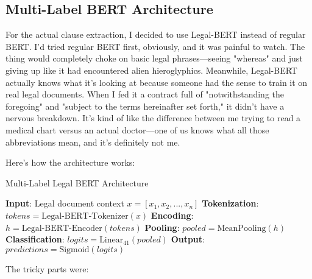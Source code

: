 \subsection{Multi-Label BERT Architecture}

For the actual clause extraction, I decided to use Legal-BERT \cite{chalkidis2020legal} instead of regular BERT. I'd tried regular BERT first, obviously, and it was painful to watch. The thing would completely choke on basic legal phrases—seeing "whereas" and just giving up like it had encountered alien hieroglyphics. Meanwhile, Legal-BERT actually knows what it's looking at because someone had the sense to train it on real legal documents. When I fed it a contract full of "notwithstanding the foregoing" and "subject to the terms hereinafter set forth," it didn't have a nervous breakdown. It's kind of like the difference between me trying to read a medical chart versus an actual doctor—one of us knows what all those abbreviations mean, and it's definitely not me.

Here's how the architecture works:

\begin{algorithm}
\caption{Multi-Label Legal BERT Architecture}
\begin{algorithmic}
\STATE \textbf{Input}: Legal document context $x = [x_1, x_2, ..., x_n]$
\STATE \textbf{Tokenization}: $tokens = \text{Legal-BERT-Tokenizer}(x)$
\STATE \textbf{Encoding}: $h = \text{Legal-BERT-Encoder}(tokens)$
\STATE \textbf{Pooling}: $pooled = \text{MeanPooling}(h)$
\STATE \textbf{Classification}: $logits = \text{Linear}_{41}(pooled)$
\STATE \textbf{Output}: $predictions = \text{Sigmoid}(logits)$
\end{algorithmic}
\end{algorithm}

The tricky parts were:

